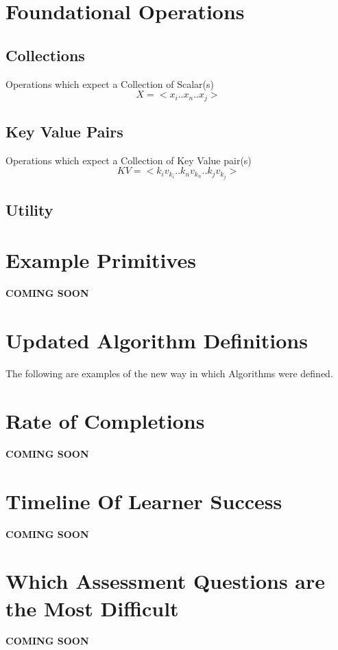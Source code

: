 \documentclass{article}
\begin{document}



\section{Foundational Operations}

\subsection{Collections}
Operations which expect a Collection of Scalar(s)
$$X = <x_{i}..x_{n}..x_{j}>$$





\subsection{Key Value Pairs}
Operations which expect a Collection of Key Value pair(s)
$$KV = <k_{i}v_{k_{i}}..k_{n}v_{k_{n}}..k_{j}v_{k_{j}}>$$





\subsection{Utility}




\section{Example Primitives}
\textbf{COMING SOON}

\section*{Updated Algorithm Definitions}
The following are examples of the new way in which Algorithms were defined.
\section{Rate of Completions}
\textbf{COMING SOON}
\section{Timeline Of Learner Success}
\textbf{COMING SOON}
\section{Which Assessment Questions are the Most Difficult}
\textbf{COMING SOON}
\end{document}
